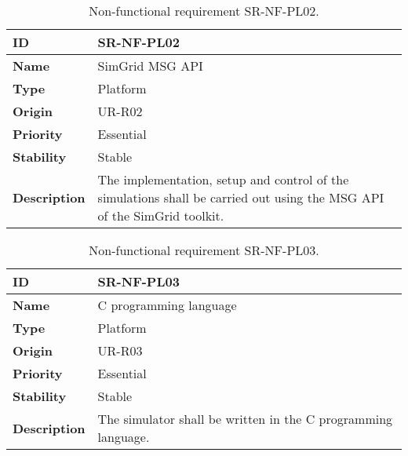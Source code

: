 \begin{center}
\begin{table*}[htbp]
\centering
\begin{tabular}{@{}p{2.5cm} p{9cm}@{}} 
\toprule
\textbf{ID} 				& SR-NF-PL02\\
\midrule
\textbf{Name} 			& SimGrid MSG API \\
\midrule
\textbf{Type} 			& Platform \\
\midrule
\textbf{Origin} 			& UR-R02 \\
\midrule
\textbf{Priority}		& Essential \\
\midrule
\textbf{Stability} 		& Stable \\
\midrule
\textbf{Description} 	& The implementation, setup and control of the simulations shall be carried out using the MSG API of the SimGrid toolkit. \\
\bottomrule
\end{tabular}
\caption{Non-functional requirement SR-NF-PL02.}
\label{tab:srnfpl02}
\end{table*}
\end{center}

\begin{center}
\begin{table*}[htbp]
\centering
\begin{tabular}{@{}p{2.5cm} p{9cm}@{}} 
\toprule
\textbf{ID} 				& SR-NF-PL03\\
\midrule
\textbf{Name} 			& C programming language \\
\midrule
\textbf{Type} 			& Platform\\
\midrule
\textbf{Origin} 			& UR-R03 \\
\midrule
\textbf{Priority}		& Essential \\
\midrule
\textbf{Stability} 		& Stable \\
\midrule
\textbf{Description} 	& The simulator shall be written in the C programming language. \\
\bottomrule
\end{tabular}
\caption{Non-functional requirement SR-NF-PL03.}
\label{tab:srnfpl03}
\end{table*}
\end{center}

